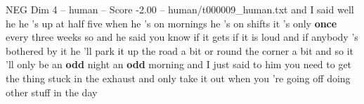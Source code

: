 \begin{textsample}{NEG Dim 4 – human – Score -2.00 – human/t000009\_human.txt}  \label{ex:f4_neg_039}
and I said well he he 's up at half five when he 's on mornings he 's on shifts it 's only \textbf{once} every three weeks so and he said you know if it gets if it is loud and if anybody 's bothered by it he 'll park it up the road a bit or round the corner a bit and so it 'll only be an \textbf{odd} night an \textbf{odd} morning and I just said to him you need to get the thing stuck in the exhaust and only take it out when you 're going off doing other stuff in the day

\end{textsample}
